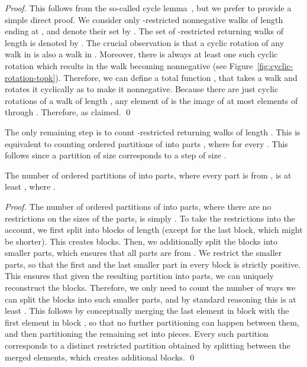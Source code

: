\documentclass[runningheads]{llncs}
\begin{document}
\begin{proof}
This follows from the so-called cycle lemma~\cite{DM47}, but we prefer
to provide a simple direct proof.  We consider only -restricted
nonnegative walks of length  ending at , and denote their
set by . The set of -restricted returning walks of length 
is denoted by . The crucial observation is that a cyclic rotation
of any walk in  is also a walk in . Moreover, there is
always at least one such cyclic rotation which results in the walk
becoming nonnegative (see
Figure~\ref{fig:cyclic-rotation-topk}). Therefore, we can define a
total function , that takes a walk  and
rotates it cyclically as to make it nonnegative. Because there are
just  cyclic rotations of a walk of length , any element of
 is the image of at most  elements of  through
. Therefore,  as claimed.  \qed
\end{proof}

The only remaining step is to count -restricted
returning walks of length .  This is equivalent to
counting ordered partitions of  into parts
, where  for
every .  This follows since a partition of
size  corresponds to a step of size .

\begin{lemma}
The number of ordered partitions of  into  parts, where every
part is from , is at least , where
.
\end{lemma}

\begin{proof}
The number of ordered partitions of  into  parts, where there
are no restrictions on the sizes of the parts, is simply
. To take the restrictions into the account, we
first split  into blocks of length  (except for the last block,
which might be shorter). This creates  blocks. Then, we
additionally split the blocks into smaller parts, which ensures that
all parts are from . We restrict the smaller parts, so that the
first and the last smaller part in every block is strictly positive.
This ensures that given the resulting partition into parts, we can uniquely
reconstruct the blocks. Therefore, we only need to count the number of
ways we can split the blocks into such smaller parts, and by standard
reasoning this is at least .  This follows
by conceptually merging the last element in block  with the first
element in block , so that no further partitioning can happen
between them, and then partitioning the remaining set into 
pieces. Every such partition corresponds to a distinct restricted
partition obtained by splitting between the merged elements, which creates
 additional blocks. 
\qed
\end{proof}
\end{document}
